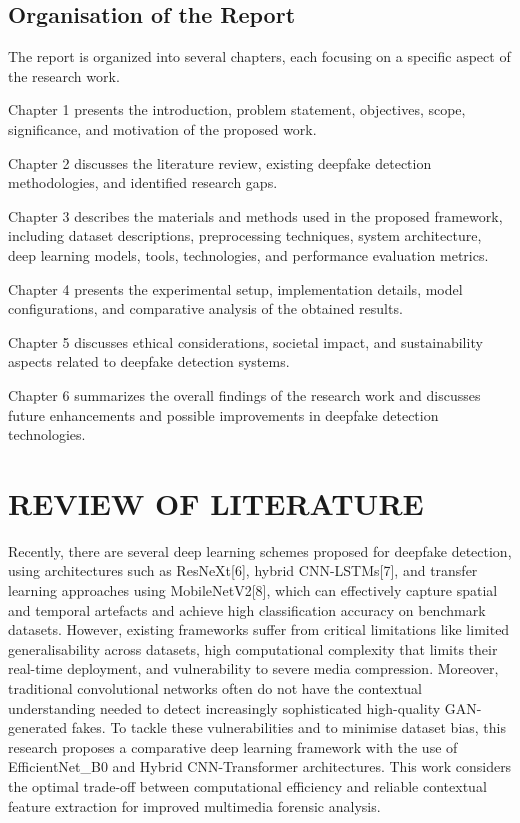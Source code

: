 \documentclass[12pt,a4paper]{report}
\begin{document}
\section{Organisation of the Report}
The report is organized into several chapters, each focusing on a specific aspect of the research work.

Chapter 1 presents the introduction, problem statement, objectives, scope, significance, and motivation of the proposed work.

Chapter 2 discusses the literature review, existing deepfake detection methodologies, and identified research gaps.

Chapter 3 describes the materials and methods used in the proposed framework, including dataset descriptions, preprocessing techniques, system architecture, deep learning models, tools, technologies, and performance evaluation metrics.

Chapter 4 presents the experimental setup, implementation details, model configurations, and comparative analysis of the obtained results.

Chapter 5 discusses ethical considerations, societal impact, and sustainability aspects related to deepfake detection systems.

Chapter 6 summarizes the overall findings of the research work and discusses future enhancements and possible improvements in deepfake detection technologies.
\chapter{REVIEW OF LITERATURE}

Recently, there are several deep learning schemes proposed for deepfake detection, using architectures such as ResNeXt[6], hybrid CNN-LSTMs[7], and transfer learning approaches using MobileNetV2[8], which can effectively capture spatial and temporal artefacts and achieve high classification accuracy on benchmark datasets. However, existing frameworks suffer from critical limitations like limited generalisability across datasets, high computational complexity that limits their real-time deployment, and vulnerability to severe media compression. Moreover, traditional convolutional networks often do not have the contextual understanding needed to detect increasingly sophisticated high-quality GAN-generated fakes. To tackle these vulnerabilities and to minimise dataset bias, this research proposes a comparative deep learning framework with the use of EfficientNet\_B0 and Hybrid CNN-Transformer architectures. This work considers the optimal trade-off between computational efficiency and reliable contextual feature extraction for improved multimedia forensic analysis.
\end{document}
